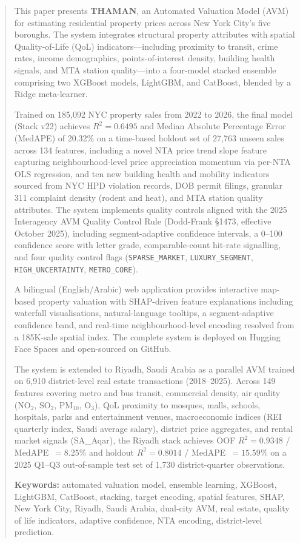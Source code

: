\documentclass[11pt, a4paper, twoside]{article}
\begin{document}
\begin{abstract}
\noindent
This paper presents \textbf{THAMAN}, an Automated Valuation Model (AVM) for
estimating residential property prices across New York City's five boroughs.
The system integrates structural property attributes with spatial
Quality-of-Life (QoL) indicators---including proximity to transit, crime rates,
income demographics, points-of-interest density, building health signals, and
MTA station quality---into a four-model stacked ensemble comprising two XGBoost
models, LightGBM, and CatBoost, blended by a Ridge meta-learner.

Trained on 185,092 NYC property sales from 2022 to 2026, the final model
(Stack v22) achieves $R^2 = 0.6495$ and Median Absolute Percentage Error
(MedAPE) of 20.32\% on a time-based holdout set of 27,763 unseen sales across
134 features, including a novel NTA price trend slope feature capturing
neighbourhood-level price appreciation momentum via per-NTA OLS regression,
and ten new building health and mobility indicators sourced from NYC HPD
violation records, DOB permit filings, granular 311 complaint density (rodent
and heat), and MTA station quality attributes. The system implements quality controls aligned with the 2025 Interagency
AVM Quality Control Rule (Dodd-Frank \S 1473, effective October 2025),
including segment-adaptive confidence intervals, a 0--100 confidence score
with letter grade, comparable-count hit-rate signalling, and four quality
control flags (\texttt{SPARSE\_MARKET}, \texttt{LUXURY\_SEGMENT},
\texttt{HIGH\_UNCERTAINTY}, \texttt{METRO\_CORE}).

A bilingual (English/Arabic) web application provides interactive map-based
property valuation with SHAP-driven feature explanations including waterfall
visualisations, natural-language tooltips, a segment-adaptive confidence band,
and real-time neighbourhood-level encoding resolved from a 185K-sale spatial
index. The complete system is deployed on Hugging Face Spaces and open-sourced
on GitHub.

The system is extended to Riyadh, Saudi Arabia as a parallel AVM trained on
6,910 district-level real estate transactions (2018--2025). Across 149 features
covering metro and bus transit, commercial density, air quality
(NO$_2$, SO$_2$, PM$_{10}$, O$_3$), QoL proximity to mosques, malls,
schools, hospitals, parks and entertainment venues, macroeconomic indices (REI
quarterly index, Saudi average salary), district price aggregates, and rental
market signals (SA\_Aqar), the Riyadh stack achieves OOF $R^2 = 0.9348$ /
MedAPE~$= 8.25\%$ and holdout $R^2 = 0.8014$ / MedAPE~$= 15.59\%$ on a 2025
Q1--Q3 out-of-sample test set of 1,730 district-quarter observations.

\medskip\noindent
\textbf{Keywords:} automated valuation model, ensemble learning, XGBoost,
LightGBM, CatBoost, stacking, target encoding, spatial features, SHAP, New York
City, Riyadh, Saudi Arabia, dual-city AVM, real estate, quality of life
indicators, adaptive confidence, NTA encoding, district-level prediction.
\end{abstract}
\end{document}
